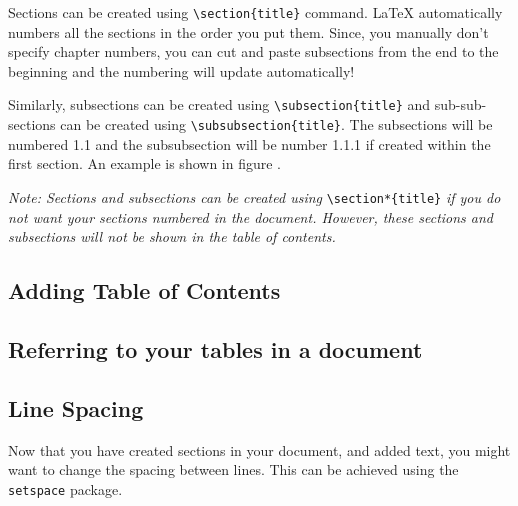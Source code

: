 \documentclass[12pts]{report}
\begin{document}
Sections can be created using \verb|\section{title}| command. {\LaTeX} automatically numbers all the sections in the order you put them. Since, you manually don't specify chapter numbers, you can cut and paste subsections from the end to the beginning and the numbering will update automatically! 

Similarly, subsections can be created using \verb|\subsection{title}| and sub-sub-sections can be created using \verb|\subsubsection{title}|. The subsections will be numbered 1.1 and the subsubsection will be number 1.1.1 if created within the first section. An example is shown in figure . 

\textit{Note: Sections and subsections can be created using} \verb|\section*{title}| \textit{if you do not want your sections numbered in the document. However, these sections and subsections will not be shown in the table of contents.}
\subsection*{Adding Table of Contents}

\subsection*{Referring to your tables in a document}

\subsection*{Line Spacing}

Now that you have created sections in your document, and added text, you might want to change the spacing between lines. This can be achieved using the \texttt{setspace} package. 
\end{document}
